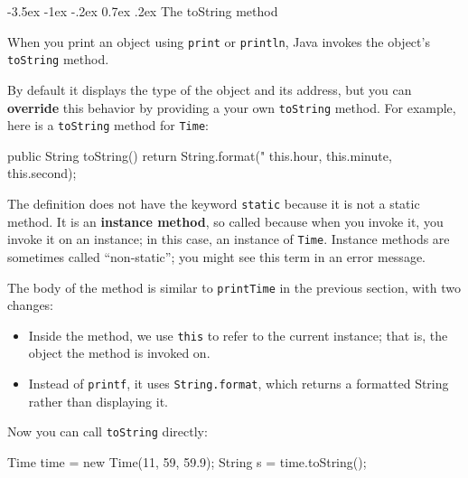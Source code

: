 \documentclass[12pt]{book}
\makeatletter
\theoremstyle{exercise}
\newcommand{\java}[1]{\verb"#1"}
\renewcommand{\section}{\@startsection{section}{1}{\z@}%
    {-3.5ex \@plus -1ex \@minus -.2ex}%
    {0.7ex \@plus.2ex}%
    {\normalfont\Large\bfseries}}
\newcommand{\java}[1]{\lstinline{#1}} %
\makeatother
\begin{document}
\section{The toString method}


When you print an object using \java{print} or \java{println}, Java invokes the object's \java{toString} method.


By default it displays the type of the object and its address, but you can {\bf override} this behavior by providing a your own \java{toString} method.  For example, here is a \java{toString} method for \java{Time}:

\begin{code}
    public String toString() {
        return String.format("%
                             this.hour, this.minute, this.second);
    }
\end{code}

The definition does not have the keyword \java{static} because it is not a static method.
It is an {\bf instance method}, so called because when you invoke it, you invoke it on an instance; in this case, an instance of \java{Time}.
Instance methods are sometimes called ``non-static''; you might see this term in an error message.


The body of the method is similar to \java{printTime} in the previous section, with two changes:

\begin{itemize}

\item Inside the method, we use \java{this} to refer to the current instance; that is, the object the method is invoked on.

\item Instead of \java{printf}, it uses \java{String.format}, which returns a formatted String rather than displaying it.

\end{itemize}


Now you can call \java{toString} directly:

\begin{code}
    Time time = new Time(11, 59, 59.9);
    String s = time.toString();
\end{code}
\end{document}

